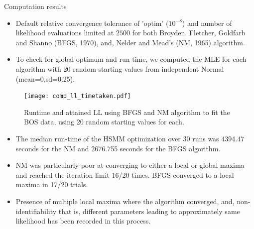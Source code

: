 \documentclass{beamer}
\begin{document}
\begin{frame}{Computation results}
\begin{itemize}

\item Default relative convergence tolerance of 'optim' ($10^{-8}$) and number of likelihood evaluations limited at $2500$ for both Broyden, Fletcher, Goldfarb and Shanno (BFGS, 1970), and, Nelder and Mead's (NM, 1965) algorithm.

\item To check for global optimum and run-time, we computed the MLE for each algorithm with 20 random starting values from independent Normal (mean=0,sd=0.25).
\end{itemize}
\end{frame}
\begin{frame}
\begin{figure}[t]\label{fig:comp_ll}
\centering
\texttt{[image: comp\_ll\_timetaken.pdf]}
\caption{Runtime and attained LL using BFGS and NM algorithm to fit the BOS data, using 20 random starting values for each.}
\end{figure}
\end{frame}
\begin{frame}
\begin{itemize}
\item The median run-time of the HSMM optimization over 30 runs was 4394.47 seconds for the NM and 2676.755 seconds for the BFGS algorithm.
\item NM was particularly poor at converging to either a local or global maxima and reached the iteration limit 16/20 times. BFGS converged to a local maxima in 17/20 trials.
\item Presence of multiple local maxima where the algorithm converged, and, non-identifiability that is, different parameters leading to approximately same likelihood has been recorded in this process.
\end{itemize}
\end{frame}
\end{document}
